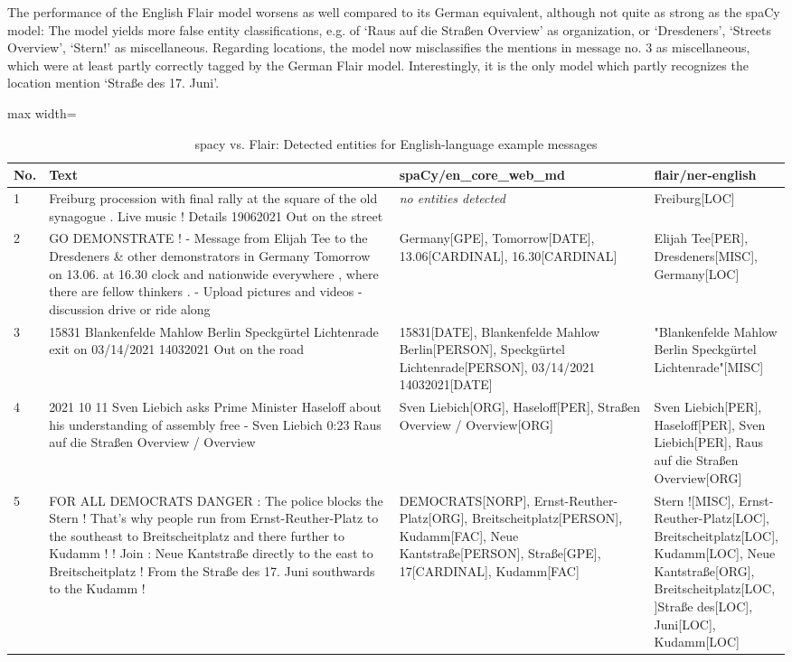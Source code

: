 The performance of the English Flair model worsens as well compared to its German equivalent, although not quite as strong as the spaCy model: The model yields more false entity classifications, e.g. of `Raus auf die Straßen Overview' as organization, or `Dresdeners', `Streets Overview', `Stern!' as miscellaneous. Regarding locations, the model now misclassifies the mentions in message no. 3 as miscellaneous, which were at least partly correctly tagged by the German Flair model. Interestingly, it is the only model which partly recognizes the location mention `Straße des 17. Juni'. 

\begin{table}[htp]
\caption{spacy vs. Flair: Detected entities for English-language example messages}
\label{tab:detect_ents_en}
\centering
\begin{adjustbox}{max width=\textwidth}
\begin{tabular}{|p{0.04\linewidth}|p{0.55\linewidth}|p{0.36\linewidth}|p{0.3\linewidth}|}
\hline
\textbf{No.} & \textbf{Text} & \textbf{spaCy/en\_core\_web\_md} & \textbf{flair/ner-english} \\
\hline 
1 
& Freiburg procession with final rally at the square of the old synagogue . Live music ! Details 19062021 Out on the street
& \textit{no entities detected}
& Freiburg[LOC]\\
\hline
2 
& GO DEMONSTRATE ! - Message from Elijah Tee to the Dresdeners \& other demonstrators in Germany Tomorrow on 13.06. at 16.30 clock and nationwide everywhere , where there are fellow thinkers . - Upload pictures and videos - discussion drive or ride along 
& Germany[GPE], Tomorrow[DATE], 13.06[CARDINAL], 16.30[CARDINAL]
& Elijah Tee[PER], Dresdeners[MISC], Germany[LOC]\\ 
\hline
3 
& 15831 Blankenfelde Mahlow Berlin Speckgürtel Lichtenrade exit on 03/14/2021 14032021 Out on the road
& 15831[DATE], Blankenfelde Mahlow Berlin[PERSON], Speckgürtel Lichtenrade[PERSON], 03/14/2021 14032021[DATE] 
& "Blankenfelde Mahlow Berlin Speckgürtel Lichtenrade"[MISC]\\ 
\hline

4 
& 2021 10 11 Sven Liebich asks Prime Minister Haseloff about his understanding of assembly free - Sven Liebich 0:23 Raus auf die Straßen Overview / Overview 
& Sven Liebich[ORG], Haseloff[PER], Straßen Overview / Overview[ORG]
& Sven Liebich[PER], Haseloff[PER], Sven Liebich[PER], Raus auf die Straßen Overview[ORG]\\ 
\hline
5 
& FOR ALL DEMOCRATS DANGER : The police blocks the Stern !   That's why people run from Ernst-Reuther-Platz to the southeast to Breitscheitplatz and there further to Kudamm ! ! Join : Neue Kantstraße directly to the east to Breitscheitplatz ! From the Straße des 17. Juni southwards to the Kudamm ! 
& DEMOCRATS[NORP], Ernst-Reuther-Platz[ORG], Breitscheitplatz[PERSON], Kudamm[FAC], Neue Kantstraße[PERSON], Straße[GPE], 17[CARDINAL], Kudamm[FAC] 
& Stern ![MISC], Ernst-Reuther-Platz[LOC], Breitscheitplatz[LOC], Kudamm[LOC], Neue Kantstraße[ORG], Breitscheitplatz[LOC, ]Straße des[LOC], Juni[LOC], Kudamm[LOC]\\ 
\hline


\end{tabular}
\end{adjustbox}
\end{table}
